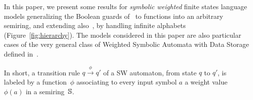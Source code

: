 In this paper, we present some results for 
\emph{symbolic weighted} finite states language models %
generalizing the Boolean guards of~\SA %
to functions into an arbitrary semiring, 
and extending also~\WA, by handling infinite alphabets (Figure~\ref{fig:hierarchy}).
%
The models considered in this paper are also 
particular cases of the very general class of 
Weighted Symbolic Automata with Data Storage defined in~\cite{Herrmann16dlt,Herrmann20phd}. 

In short, a transition rule $q \xrightarrow{\phi} q'$ of a SW automaton, 
from state $q$ to $q'$,
is labeled by a function~$\phi$ associating to every input symbol $a$ a weight value $\phi(a)$
in a semiring~$\mathbb{S}$.

